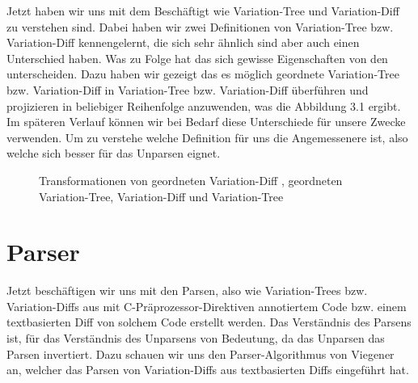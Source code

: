 Jetzt haben wir uns mit dem Beschäftigt wie Variation-Tree und Variation-Diff zu verstehen sind. Dabei haben wir zwei Definitionen von Variation-Tree bzw. Variation-Diff kennengelernt, die sich sehr ähnlich sind aber auch einen Unterschied haben. Was zu Folge hat das sich gewisse Eigenschaften von den unterscheiden. Dazu haben wir gezeigt das es möglich geordnete Variation-Tree bzw. Variation-Diff in Variation-Tree bzw. Variation-Diff überführen und projizieren in beliebiger Reihenfolge anzuwenden, was die Abbildung 3.1 ergibt. Im späteren Verlauf können wir bei Bedarf diese Unterschiede für unsere Zwecke verwenden. Um zu verstehe welche Definition für uns die Angemessenere ist, also welche sich besser für das Unparsen eignet.

\begin{figure}[H]
	\centering
	\caption{Transformationen von geordneten Variation-Diff , geordneten Variation-Tree, Variation-Diff und Variation-Tree}
\end{figure}


\section{Parser}

Jetzt beschäftigen wir uns mit den Parsen, also wie Variation-Trees bzw. Variation-Diffs  aus mit C-Präprozessor-Direktiven annotiertem Code bzw. einem textbasierten Diff von solchem Code erstellt werden. Das Verständnis des Parsens ist, für das Verständnis des Unparsens von Bedeutung, da das Unparsen das Parsen invertiert. Dazu schauen wir uns den Parser-Algorithmus von Viegener~\cite{Viegener21} an, welcher das Parsen von Variation-Diffs aus textbasierten Diffs eingeführt hat.\\



